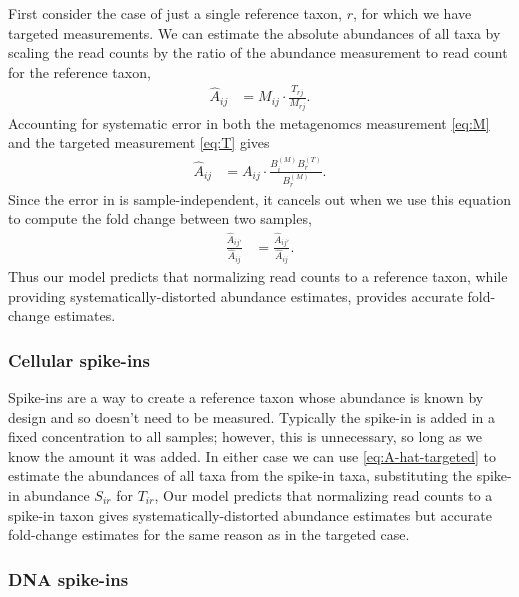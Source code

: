 \documentclass[
]{article}
\theoremstyle{definition}
\theoremstyle{definition}
\theoremstyle{definition}
\theoremstyle{definition}
\theoremstyle{remark}
\begin{document}
First consider the case of just a single reference taxon, \(r\), for which we have targeted measurements.
We can estimate the absolute abundances of all taxa by scaling the read counts by the ratio of the abundance measurement to read count for the reference taxon,
\begin{align}
  \label{eq:A-hat-targeted}
  \hat A_{ij} &= M_{ij} \cdot \frac{T_{rj}}{M_{rj}}.
\end{align}
Accounting for systematic error in both the metagenomcs measurement \eqref{eq:M} and the targeted measurement \eqref{eq:T} gives
\begin{align}
  \label{eq:error-targeted}
  \hat A_{ij} &= A_{ij} \cdot \frac{B^{(M)}_i B^{(T)}_r}{B^{(M)}_r}.
\end{align}
Since the error in \label{eq:error-targeted} is sample-independent, it cancels out when we use this equation to compute the fold change between two samples,
\begin{align}
  \label{eq:fc-targeted}
  \frac{\hat A_{ij'}}{\hat A_{ij}} &=\frac{\hat A_{ij'}}{\hat A_{ij}}.
\end{align}
Thus our model predicts that normalizing read counts to a reference taxon, while providing systematically-distorted abundance estimates, provides accurate fold-change estimates.

\hypertarget{cellular-spike-ins}{%
\subsubsection{Cellular spike-ins}\label{cellular-spike-ins}}

Spike-ins are a way to create a reference taxon whose abundance is known by design and so doesn't need to be measured.
Typically the spike-in is added in a fixed concentration to all samples; however, this is unnecessary, so long as we know the amount it was added.
In either case we can use \eqref{eq:A-hat-targeted} to estimate the abundances of all taxa from the spike-in taxa, substituting the spike-in abundance \(S_{ir}\) for \(T_{ir}\),
Our model predicts that normalizing read counts to a spike-in taxon gives systematically-distorted abundance estimates but accurate fold-change estimates for the same reason as in the targeted case.

\hypertarget{dna-spike-ins}{%
\subsubsection{DNA spike-ins}\label{dna-spike-ins}}
\end{document}
